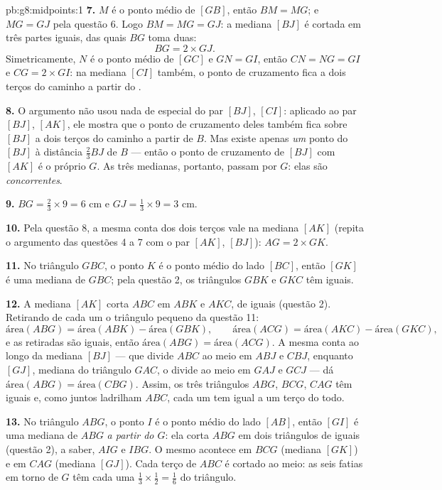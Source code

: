 \begin{solution}{pb:g8:midpoints:1}
\textbf{7.} $M$ é o ponto médio de $[GB]$, então $BM = MG$; e
$MG = GJ$ pela questão 6. Logo $BM = MG = GJ$: a mediana $[BJ]$ é
cortada em três partes iguais, das quais $BG$ toma duas:
\[
BG = 2 \times GJ .
\]
Simetricamente, $N$ é o ponto médio de $[GC]$ e $GN = GI$, então
$CN = NG = GI$ e $CG = 2 \times GI$: na mediana $[CI]$ também, o ponto
de cruzamento fica a dois terços do caminho a partir do .

\textbf{8.} O argumento não usou nada de especial do par $[BJ]$,
$[CI]$: aplicado ao par $[BJ]$, $[AK]$, ele mostra que o ponto de
cruzamento deles também fica sobre $[BJ]$ a dois terços do caminho a
partir de $B$. Mas existe apenas \emph{um} ponto do  $[BJ]$ à
distância $\frac23 BJ$ de $B$ --- então o ponto de cruzamento de $[BJ]$
com $[AK]$ é o próprio $G$. As três medianas, portanto, passam por
$G$: elas são \emph{concorrentes}.

\textbf{9.} $BG = \frac23 \times 9 = 6$ cm e
$GJ = \frac13 \times 9 = 3$ cm.

\textbf{10.} Pela questão 8, a mesma conta dos dois terços vale na
mediana $[AK]$ (repita o argumento das questões 4 a 7 com o par
$[AK]$, $[BJ]$): $AG = 2 \times GK$.

\textbf{11.} No triângulo $GBC$, o ponto $K$ é o ponto médio do lado
$[BC]$, então $[GK]$ é uma mediana de $GBC$; pela questão 2, os
triângulos $GBK$ e $GKC$ têm  iguais.

\textbf{12.} A mediana $[AK]$ corta $ABC$ em $ABK$ e $AKC$, de 
iguais (questão 2). Retirando de cada um o triângulo pequeno da questão
11:
\[
\text{área}(ABG) = \text{área}(ABK) - \text{área}(GBK),
\qquad
\text{área}(ACG) = \text{área}(AKC) - \text{área}(GKC),
\]
e as  retiradas são iguais, então
$\text{área}(ABG) = \text{área}(ACG)$. A mesma conta ao longo da
mediana $[BJ]$ --- que divide $ABC$ ao meio em $ABJ$ e $CBJ$, enquanto
$[GJ]$, mediana do triângulo $GAC$, o divide ao meio em $GAJ$ e $GCJ$
--- dá $\text{área}(ABG) = \text{área}(CBG)$. Assim, os três triângulos
$ABG$, $BCG$, $CAG$ têm  iguais e, como juntos ladrilham $ABC$,
cada um tem  igual a um terço do todo.

\textbf{13.} No triângulo $ABG$, o ponto $I$ é o ponto médio do lado
$[AB]$, então $[GI]$ é uma mediana de $ABG$ \emph{a partir do 
$G$}: ela corta $ABG$ em dois triângulos de  iguais (questão 2),
a saber, $AIG$ e $IBG$. O mesmo acontece em $BCG$ (mediana $[GK]$) e em
$CAG$ (mediana $[GJ]$). Cada terço de $ABC$ é cortado ao meio: as seis
fatias em torno de $G$ têm cada uma 
$\frac13 \times \frac12 = \frac16$ do triângulo.


\end{solution}
